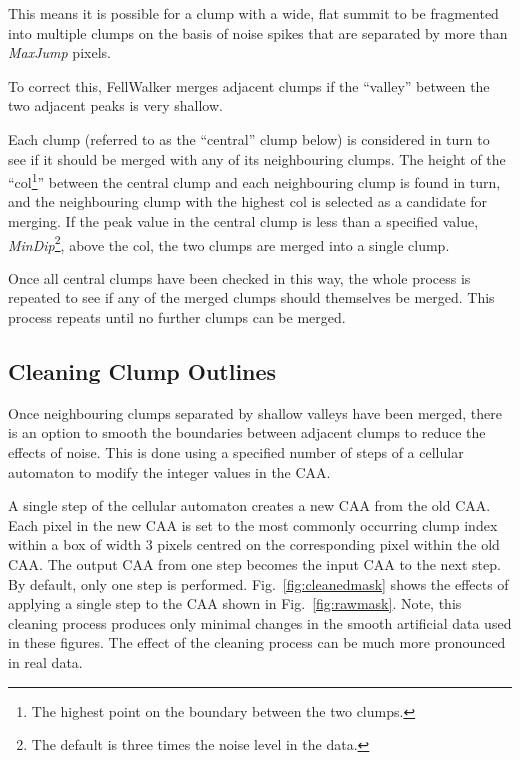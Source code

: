 \documentclass[final,authoryear,5p,times,twocolumn]{elsarticle}
\begin{document}
This means it is possible for a clump with a wide, flat summit to be
fragmented into multiple clumps on the basis of noise spikes that are
separated by more than \emph{MaxJump} pixels.

To correct this, FellWalker merges adjacent clumps if the ``valley''
between the two adjacent peaks is very shallow.

Each clump (referred to as the ``central'' clump below) is considered in
turn to see if it should be merged with any of its neighbouring clumps.
The height of the ``col\footnote{The highest point on the boundary
between the two clumps.}'' between the central clump and each
neighbouring clump is found in turn, and the neighbouring clump with the
highest col is selected as a candidate for merging. If the peak value in
the central clump is less than a specified value,
\emph{MinDip}\footnote{The default is three times the noise level in the
data.}, above the col, the two clumps are merged into a single clump.

Once all central clumps have been checked in this way, the whole process
is repeated to see if any of the merged clumps should themselves be
merged. This process repeats until no further clumps can be merged.

\subsection{Cleaning Clump Outlines}
\label{sec:cleaning}

Once neighbouring clumps separated by shallow valleys have been merged,
there is an option to smooth the boundaries between adjacent clumps to
reduce the effects of noise. This is done using a specified number of
steps of a cellular automaton to modify the integer values in the CAA.

A single step of the cellular automaton creates a new CAA from the old
CAA. Each pixel in the new CAA is set to the most commonly occurring
clump index within a box of width 3 pixels centred on the corresponding
pixel within the old CAA. The output CAA from one step becomes the input
CAA to the next step. By default, only one step is performed.
Fig.~\ref{fig:cleanedmask} shows the effects of applying a single step to
the CAA shown in Fig.~\ref{fig:rawmask}. Note, this cleaning process
produces only minimal changes in the smooth artificial data used in these
figures. The effect of the cleaning process can be much more pronounced
in real data.
\end{document}

